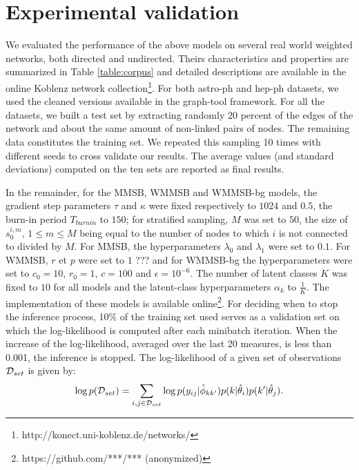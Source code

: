 \section{Experimental validation}
\label{sec:exps}

We evaluated the performance of the above models on several real world weighted networks, both directed and undirected. Theirs characteristics and properties are summarized in Table \ref{table:corpus} and detailed descriptions are available in the online Koblenz network collection\footnote{http://konect.uni-koblenz.de/networks/}. For both astro-ph and hep-ph datasets, we used the cleaned versions available in the  graph-tool framework.
 For all the datasets, we built a test set by extracting randomly 20 percent of the edges of the network and about the same amount of non-linked pairs of nodes. The remaining data constitutes the training set. We repeated this sampling 10 times with different seeds to cross validate our results. The average values (and standard deviations) computed on the ten sets are reported as final results.

\begin{table*}[t]
\bgroup
\def\arraystretch{1} %
	
\egroup
\label{table:corpus}
\end{table*}

In the remainder, for the MMSB, WMMSB and WMMSB-bg models, the gradient step parameters  $\tau$ and $\kappa$ were fixed respectively to  $1024$ and $0.5$, the burn-in period $T_{burnin}$ to $150$; for stratified sampling, $M$ was set to $50$, the size of $s_0^{i,m}, \, 1 \le m \le M$ being equal to the number of nodes to which $i$ is not connected to divided by $M$. For MMSB, the hyperparameters $\lambda_0$ and $\lambda_1$ were set to $0.1$. For WMMSB, $r$ et $p$ were set to $1$ ??? and for WMMSB-bg the hyperparameters were set to  $c_0=10$, $r_0=1$, $c=100$ and $\epsilon=10^{-6}$. The number of latent classes $K$ was fixed to $10$ for all models and the latent-class hyperparameters $\alpha_k$ to $\frac{1}{K}$. The implementation of these models is available online\footnote{https://github.com/***/*** (anonymized)}. For deciding when to stop the inference process, 10\% of the training set used serves as a validation set on which the log-likelihood is computed after each minibatch iteration. When the increase of the log-likelihood, averaged over the last 20 measures, is less than 0.001, the inference is stopped. The log-likelihood of a given set of observations $\mathcal{D}_{set}$  is given by:
%
\begin{equation*}
\log p(\mathcal{D}_{set}) = \sum_{i,j \in \mathcal{D}_{set}} \log p(y_{ij} | \hat\phi_{kk'}) p(k|\hat\theta_i) p(k'|\hat\theta_j).
\end{equation*}
%

